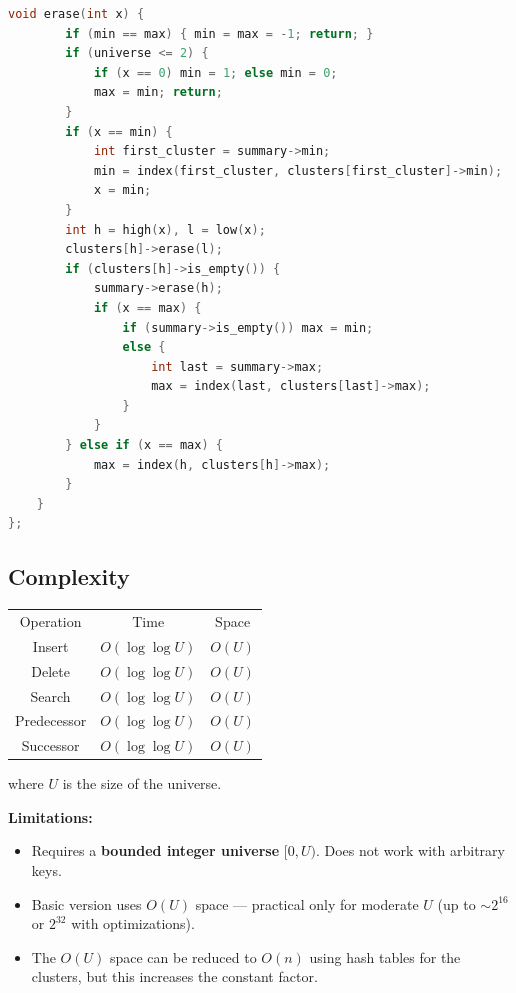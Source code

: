 \begin{lstlisting}[language=C++]
    void erase(int x) {
        if (min == max) { min = max = -1; return; }
        if (universe <= 2) {
            if (x == 0) min = 1; else min = 0;
            max = min; return;
        }
        if (x == min) {
            int first_cluster = summary->min;
            min = index(first_cluster, clusters[first_cluster]->min);
            x = min;
        }
        int h = high(x), l = low(x);
        clusters[h]->erase(l);
        if (clusters[h]->is_empty()) {
            summary->erase(h);
            if (x == max) {
                if (summary->is_empty()) max = min;
                else {
                    int last = summary->max;
                    max = index(last, clusters[last]->max);
                }
            }
        } else if (x == max) {
            max = index(h, clusters[h]->max);
        }
    }
};
\end{lstlisting}

\subsection{Complexity}

\begin{center}
\begin{tabular}{ccc}
\toprule
Operation & Time & Space \\
Insert & $O(\log \log U)$ & $O(U)$ \\
Delete & $O(\log \log U)$ & $O(U)$ \\
Search & $O(\log \log U)$ & $O(U)$ \\
Predecessor & $O(\log \log U)$ & $O(U)$ \\
Successor & $O(\log \log U)$ & $O(U)$ \\
\bottomrule
\end{tabular}
\end{center}

where $U$ is the size of the universe.

\textbf{Limitations:}
\begin{itemize}
\item Requires a \textbf{bounded integer universe} $[0, U)$. Does not work with arbitrary keys.
\item Basic version uses $O(U)$ space --- practical only for moderate $U$ (up to $\sim 2^{16}$ or $2^{32}$ with optimizations).
\item The $O(U)$ space can be reduced to $O(n)$ using hash tables for the clusters, but this increases the constant factor.
\end{itemize}


